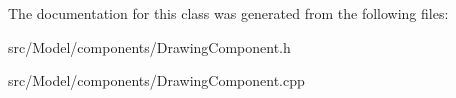 The documentation for this class was generated from the following files\+:\begin{DoxyCompactItemize}
\item 
src/\+Model/components/Drawing\+Component.\+h\item 
src/\+Model/components/Drawing\+Component.\+cpp\end{DoxyCompactItemize}
